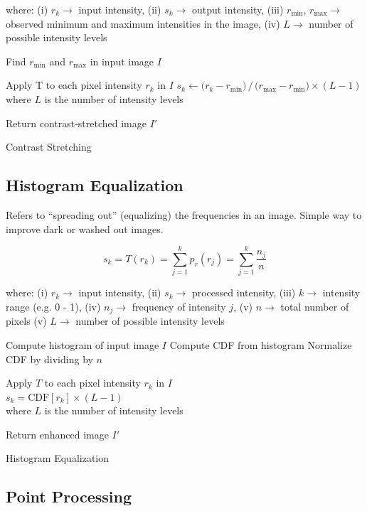 where: (i) $r_k\rightarrow$ input intensity, (ii) $s_k\rightarrow$
output intensity, (iii) $r_{\min},\,r_{\max}\rightarrow$ observed
minimum and maximum intensities in the image, (iv) $L\rightarrow$
number of possible intensity levels

\begin{algorithm}[ht!]
  \DontPrintSemicolon
  Find $r_{\min}$ and $r_{\max}$ in input image $I$ \;

  {
    Apply T to each pixel intensity $r_k$ in $I$ \;
    \nonl $s_k \leftarrow \bigl(r_k -
    r_{\min}\bigr)\,/\,\bigl(r_{\max}-r_{\min}\bigr)\times(L-1)$ \;
    \nonl where $L$ is the number of intensity levels \;
  }

  Return contrast-stretched image $I'$\;
  \caption{Contrast Stretching}
\end{algorithm}

\subsection*{Histogram Equalization}

Refers to \enquote{spreading out} (equalizing) the frequencies in an
image. Simple way to improve dark or washed out images.

\begin{equation*}
  s_k = T(r_k) = \sum_{j=1}^{k} p_r(r_j) = \sum_{j=1}^{k} \frac{n_j}{n}
\end{equation*}

where: (i) $r_k \rightarrow$ input intensity, (ii) $s_k \rightarrow$
processed intensity, (iii) $k \rightarrow$ intensity range (e.g. 0 -
1), (iv) $n_j \rightarrow$ frequency of intensity $j$, (v) $n
\rightarrow$ total number of pixels (v) $L\rightarrow$ number of
possible intensity levels

\begin{algorithm}[ht!]
  \DontPrintSemicolon
  Compute histogram of input image $I$ \;
  Compute CDF from histogram \;
  Normalize CDF by dividing by $n$ \;

  {
    Apply $T$ to each pixel intensity $r_k$ in $I$\\
    \nonl $s_k = \text{CDF}[r_k] \times (L - 1)$ \\
    \nonl where $L$ is the number of intensity levels \;
  }

  Return enhanced image $I'$\;
  \caption{Histogram Equalization}
\end{algorithm}

\subsection*{Point Processing}

